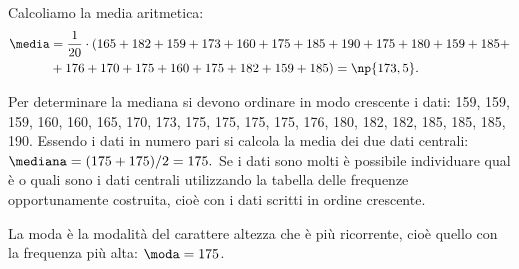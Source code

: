 \begin{exrig}
\begin{esempio}
Calcoliamo la media aritmetica:
\begin{equation*}
\begin{split}
\media &= \frac{1}{20} \cdot (165+182+159+173+160+175+185+190+175+180+159+185+\\
 &+176+170+175+160+175+182+159+185)=\np{173,5}.
\end{split}
\end{equation*}

Per determinare la mediana si devono ordinare in modo crescente i dati:
159, 159, 159, 160, 160, 165, 170, 173, 175, 175, 175, 175, 176, 180, 182, 182, 185, 185, 185, 190.
Essendo i dati in numero pari si calcola la media dei due dati centrali:
$\mediana = (175+175)/2=175.$
Se i dati sono molti è possibile individuare qual è o quali sono i dati centrali utilizzando la tabella delle
frequenze opportunamente costruita, cioè con i dati scritti in ordine crescente.

La moda è la modalità del carattere altezza che è più ricorrente, cioè quello con la frequenza più alta:
$\moda = 175$.
\end{esempio}
\end{exrig}

\ovalbox{\risolvii \ref{ese:A.33}, \ref{ese:A.34}, \ref{ese:A.35}, \ref{ese:A.36}, \ref{ese:A.37}, \ref{ese:A.38}}
\newpage

\cleardoublepage

